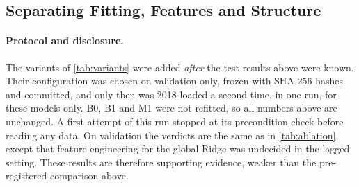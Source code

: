 \subsection{Separating Fitting, Features and Structure}
\label{sec:eval-ablation}

\paragraph{Protocol and disclosure.} The variants of \cref{tab:variants} were added \emph{after} the
test results above were known. Their configuration was chosen on validation only, frozen with
SHA-256 hashes and committed, and only then was 2018 loaded a second time, in one run, for these
models only. B0, B1 and M1 were not refitted, so all numbers above are unchanged. A first attempt of
this run stopped at its precondition check before reading any data. On validation the verdicts are
the same as in \cref{tab:ablation}, except that feature engineering for the global Ridge was
undecided in the lagged setting. These results are therefore supporting evidence, weaker than the
pre-registered comparison above.

